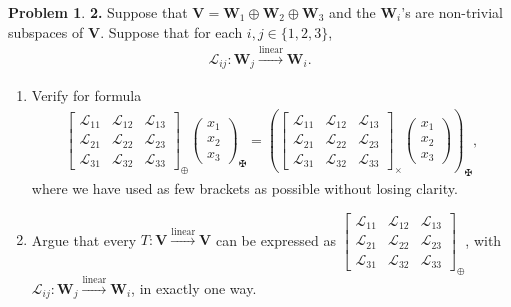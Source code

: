 \documentclass{book}
\theoremstyle{definition}
\newtheorem*{prob*}{Problem}
\newcommand{\V}{\mathbf{V}}
\newcommand{\W}{\mathbf{W}}
\newcommand{\lag}{\mathcal{L}}
\begin{document}
\newpage


\begin{prob*}\textbf{2.} Suppose that $\V = \W_1\oplus \W_2\oplus \W_3$ and the $\W_i$'s are non-trivial subspaces of $\V$. Suppose that for each $i,j \in \{1,2,3 \}$,
	\begin{align*}
	\lag_{ij} : \W_j \overset{\text{linear}}{\longrightarrow} \W_i.
	\end{align*}
	\begin{enumerate}
		\item Verify for formula 
		\begin{align*}
		\begin{bmatrix}
		\lag_{11} & \lag_{12} & \lag_{13}\\
		\lag_{21} & \lag_{22} & \lag_{23}\\
		\lag_{31} & \lag_{32} & \lag_{33}
		\end{bmatrix}_{\oplus} 
		\begin{pmatrix}
		x_1\\x_2\\x_3
		\end{pmatrix}_{\maltese} 
		=
		\left( \begin{bmatrix}
		\lag_{11} & \lag_{12} & \lag_{13}\\
		\lag_{21} & \lag_{22} & \lag_{23}\\
		\lag_{31} & \lag_{32} & \lag_{33}
		\end{bmatrix}_\times \begin{pmatrix}
		x_1\\x_2\\x_3
		\end{pmatrix}   \right)_{\maltese},
		\end{align*}
		where we have used as few brackets as possible without losing clarity.
		
		
		
		\item Argue that every $T : \V \overset{\text{linear}}{\longrightarrow} \V$ can be expressed as $\begin{bmatrix}
		\lag_{11} & \lag_{12} & \lag_{13}\\
		\lag_{21} & \lag_{22} & \lag_{23}\\
		\lag_{31} & \lag_{32} & \lag_{33}
		\end{bmatrix}_\oplus$, with $\lag_{ij} : \W_j \overset{\text{linear}}{\longrightarrow} \W_i$, in exactly one way.
		

\end{enumerate}
\end{prob*}
\end{document}
